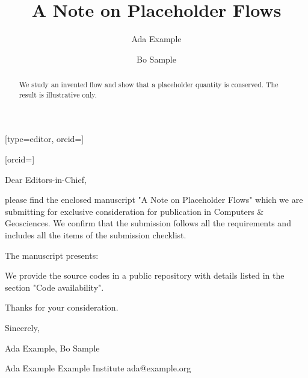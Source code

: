 \documentclass[a4paper,fleqn]{cas-sc}
\begin{document}
\let\WriteBookmarks\relax
\def\floatpagepagefraction{1}
\def\textpagefraction{.001}

\title [mode = title]{A Note on Placeholder Flows}





\author[1]{Ada Example}[type=editor, orcid=]

\author[2]{Bo Sample}[orcid=]


\address[1]{Example Institute}
\address[2]{Sample University}


\begin{abstract}
We study an invented flow and show that a placeholder quantity is conserved.
The result is illustrative only.
\end{abstract}


\begin{coverletter}

Dear Editors-in-Chief,
\newline
 
please find the enclosed manuscript "A Note on Placeholder Flows" which we are submitting for exclusive consideration for publication in Computers \& Geosciences. We confirm that the submission follows all the requirements and includes all the items of the submission checklist.  
\newline
 
The manuscript presents:
\newline

We provide the source codes in a public repository with details listed in the section "Code availability".
\newline

Thanks for your consideration. 
\newline

Sincerely,
\newline

Ada Example, Bo Sample

Ada Example Example Institute ada@example.org
\newline

\end{coverletter}
\end{document}
